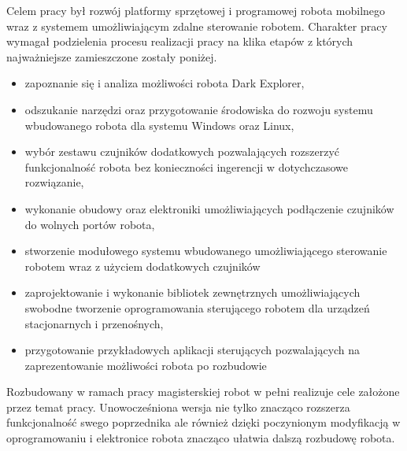 Celem pracy był rozwój platformy sprzętowej i programowej robota mobilnego wraz
z systemem umożliwiającym zdalne sterowanie robotem. Charakter pracy wymagał
podzielenia procesu realizacji pracy na klika etapów z których najważniejsze
zamieszczone zostały poniżej.
\begin{itemize}
  \item zapoznanie się i analiza możliwości robota Dark Explorer,
  \item odszukanie narzędzi oraz przygotowanie środowiska do rozwoju systemu
  wbudowanego robota dla systemu Windows oraz Linux,
  \item wybór zestawu czujników dodatkowych pozwalających rozszerzyć
  funkcjonalność robota bez konieczności ingerencji w dotychczasowe rozwiązanie,
  \item wykonanie obudowy oraz elektroniki umożliwiających podłączenie czujników
  do wolnych portów robota, 
  \item stworzenie modułowego systemu wbudowanego umożliwiającego sterowanie
  robotem wraz z użyciem dodatkowych czujników
  \item zaprojektowanie i wykonanie bibliotek zewnętrznych umożliwiających
  swobodne tworzenie oprogramowania sterującego robotem dla urządzeń
  stacjonarnych i przenośnych,
  \item przygotowanie przykładowych aplikacji sterujących pozwalających na
  zaprezentowanie możliwości robota po rozbudowie
\end{itemize}
Rozbudowany w ramach pracy magisterskiej robot w pełni realizuje cele założone
przez temat pracy. Unowocześniona wersja nie tylko znacząco rozszerza
funkcjonalność swego poprzednika ale również dzięki poczynionym modyfikacją w
oprogramowaniu i elektronice robota znacząco ułatwia dalszą rozbudowę robota. 
